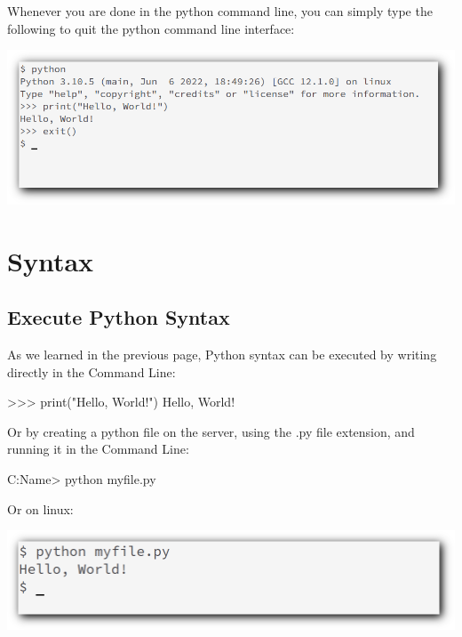 \documentclass[12pt,a4paper]{article}
\begin{document}
Whenever you are done in the python command line, you can simply type the
following to quit the python command line interface:

\begin{center}
	\includegraphics[width=.8\textwidth]{shots/getting_started/exitf.png}
\end{center}

\section{Syntax}
\subsection{Execute Python Syntax}
As we learned in the previous page, Python syntax can be executed by writing
directly in the Command Line:

\begin{ebox}
\begin{vercode}
>>> print("Hello, World!")
Hello, World!
\end{vercode}
\end{ebox}

Or by creating a python file on the server, using the .py file extension, and
running it in the Command Line:

\begin{ebox}
\begin{vercode}
C:\Users\Your Name> python myfile.py
\end{vercode}
\end{ebox}

Or on linux:

\begin{center}
	\includegraphics[width=.9\textwidth]{shots/getting_started/linux-run.png}
\end{center}
\end{document}
